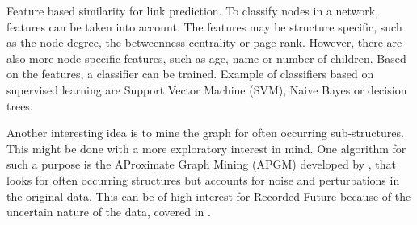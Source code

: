 Feature based similarity for link prediction. To classify nodes in a network, features can be taken into account. The features may be structure specific, such as the node degree, the betweenness centrality or page rank. However, there are also more node specific features, such as age, name or number of children. Based on the features, a classifier can be trained. Example of classifiers based on supervised learning are Support Vector Machine (SVM), Naive Bayes or decision trees.

Another interesting idea is to mine the graph for often occurring sub-structures. This might be done with a more exploratory interest in mind. One algorithm for such a purpose is the AProximate Graph Mining (APGM) developed by \citet{Jia2011}, that looks for often occurring structures but accounts for noise and perturbations in the original data. This can be of high interest for Recorded Future because of the uncertain nature of the data, covered in .